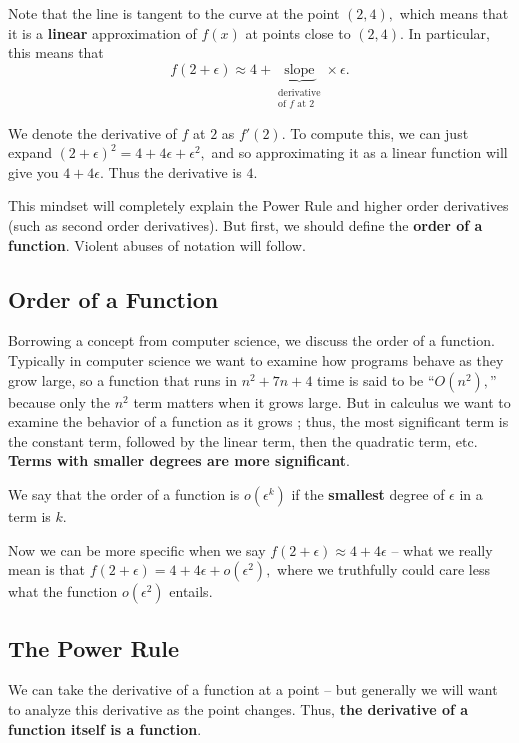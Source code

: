 \documentclass{article}
\begin{document}
\begin{sol}
Note that the line is tangent to the curve at the point $(2,4),$ which means that it is a \textbf{linear} approximation of $f(x)$ at points close to $(2,4).$ In particular, this means that
\[f(2+\epsilon)\approx 4+\underbrace{\text{slope}}_{\substack{\text{derivative} \\ \text{of } f \text{ at }2}}\times \epsilon.\]

We denote the derivative of $f$ at $2$ as $f'(2).$ To compute this, we can just expand $(2+\epsilon)^2=4+4\epsilon+\epsilon^2,$ and so approximating it as a linear function will give you $4+4\epsilon.$ Thus the derivative is $4.$
\end{sol}

This mindset will completely explain the Power Rule and higher order derivatives (such as second order derivatives).  But first, we should define the \textbf{order of a function}. Violent abuses of notation will follow.

\subsection{Order of a Function}
Borrowing a concept from computer science, we discuss the order of a function. Typically in computer science we want to examine how programs behave as they grow large, so a function that runs in $n^2+7n+4$ time is said to be ``$O(n^2),$'' because only the $n^2$ term matters when it grows large. But in calculus we want to examine the behavior of a function as it grows ; thus, the most significant term is the constant term, followed by the linear term, then the quadratic term, etc. \textbf{Terms with smaller degrees are more significant}.

\begin{defi}[Order]
We say that the order of a function is $o(\epsilon^k)$ if the \textbf{smallest} degree of $\epsilon$ in a term is $k.$
\end{defi}

Now we can be more specific when we say $f(2+\epsilon)\approx 4+4\epsilon$ -- what we really mean is that $f(2+\epsilon)=4+4\epsilon+o(\epsilon^2),$ where we truthfully could care less what the function $o(\epsilon^2)$ entails.

\subsection{The Power Rule}

We can take the derivative of a function at a point -- but generally we will want to analyze this derivative as the point changes. Thus, \textbf{the derivative of a function itself is a function}.
\end{document}
